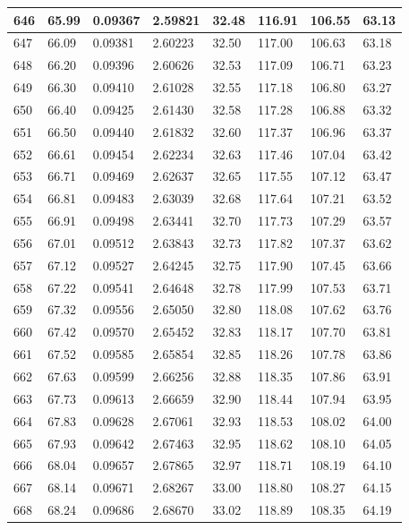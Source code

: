 \documentclass[12pt,a4paper,twoside]{article}
\begin{document}
\begin{center}
\begin{longtable}{l l l l | l l l l}
646 & 65.99 & 0.09367 & 2.59821 & 32.48 & 116.91 & 106.55 & 63.13 \\ \hline
647 & 66.09 & 0.09381 & 2.60223 & 32.50 & 117.00 & 106.63 & 63.18 \\ \hline
648 & 66.20 & 0.09396 & 2.60626 & 32.53 & 117.09 & 106.71 & 63.23 \\ \hline
649 & 66.30 & 0.09410 & 2.61028 & 32.55 & 117.18 & 106.80 & 63.27 \\ \hline
650 & 66.40 & 0.09425 & 2.61430 & 32.58 & 117.28 & 106.88 & 63.32 \\ \hline
651 & 66.50 & 0.09440 & 2.61832 & 32.60 & 117.37 & 106.96 & 63.37 \\ \hline
652 & 66.61 & 0.09454 & 2.62234 & 32.63 & 117.46 & 107.04 & 63.42 \\ \hline
653 & 66.71 & 0.09469 & 2.62637 & 32.65 & 117.55 & 107.12 & 63.47 \\ \hline
654 & 66.81 & 0.09483 & 2.63039 & 32.68 & 117.64 & 107.21 & 63.52 \\ \hline
655 & 66.91 & 0.09498 & 2.63441 & 32.70 & 117.73 & 107.29 & 63.57 \\ \hline
656 & 67.01 & 0.09512 & 2.63843 & 32.73 & 117.82 & 107.37 & 63.62 \\ \hline
657 & 67.12 & 0.09527 & 2.64245 & 32.75 & 117.90 & 107.45 & 63.66 \\ \hline
658 & 67.22 & 0.09541 & 2.64648 & 32.78 & 117.99 & 107.53 & 63.71 \\ \hline
659 & 67.32 & 0.09556 & 2.65050 & 32.80 & 118.08 & 107.62 & 63.76 \\ \hline
660 & 67.42 & 0.09570 & 2.65452 & 32.83 & 118.17 & 107.70 & 63.81 \\ \hline
661 & 67.52 & 0.09585 & 2.65854 & 32.85 & 118.26 & 107.78 & 63.86 \\ \hline
662 & 67.63 & 0.09599 & 2.66256 & 32.88 & 118.35 & 107.86 & 63.91 \\ \hline
663 & 67.73 & 0.09613 & 2.66659 & 32.90 & 118.44 & 107.94 & 63.95 \\ \hline
664 & 67.83 & 0.09628 & 2.67061 & 32.93 & 118.53 & 108.02 & 64.00 \\ \hline
665 & 67.93 & 0.09642 & 2.67463 & 32.95 & 118.62 & 108.10 & 64.05 \\ \hline
666 & 68.04 & 0.09657 & 2.67865 & 32.97 & 118.71 & 108.19 & 64.10 \\ \hline
667 & 68.14 & 0.09671 & 2.68267 & 33.00 & 118.80 & 108.27 & 64.15 \\ \hline
668 & 68.24 & 0.09686 & 2.68670 & 33.02 & 118.89 & 108.35 & 64.19 \\ \hline

\end{longtable}
\end{center}
\end{document}
